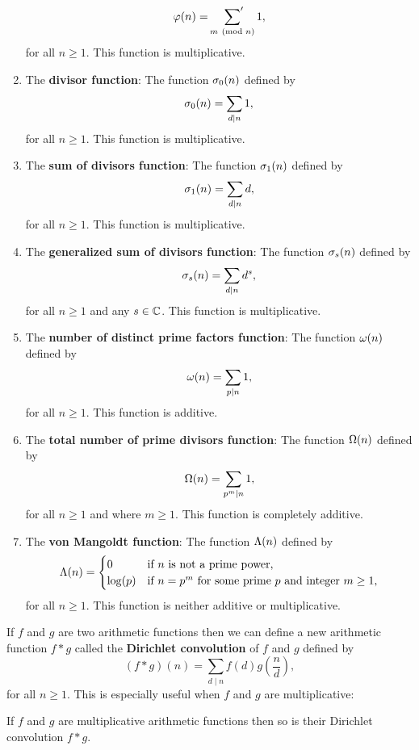 \begin{enumerate}[label=(\roman*)]
      \[
        \varphi(n) = \sideset{}{'}\sum_{m \ (\mathrm{mod}\text{ }n)}1,
      \]
      for all $n \ge 1$. This function is multiplicative.
      \item The \textbf{divisor function}: The function $\sigma_{0}(n)$ defined by
      \[
        \sigma_{0}(n) = \sum_{d \mid n}1,
      \]
      for all $n \ge 1$. This function is multiplicative.
      \item The \textbf{sum of divisors function}: The function $\sigma_{1}(n)$ defined by
      \[
        \sigma_{1}(n) = \sum_{d \mid n}d,
      \]
      for all $n \ge 1$. This function is multiplicative.
      \item The \textbf{generalized sum of divisors function}: The function $\sigma_{s}(n)$ defined by
      \[
        \sigma_{s}(n) = \sum_{d \mid n}d^{s},
      \]
      for all $n \ge 1$ and any $s \in \mathbb{C}$. This function is multiplicative.
      \item The \textbf{number of distinct prime factors function}: The function $\omega(n)$ defined by
      \[
        \omega(n) = \sum_{p \mid n}1,
      \]
      for all $n \ge 1$. This function is additive.
      \item The \textbf{total number of prime divisors function}: The function $\Omega(n)$ defined by
      \[
        \Omega(n) = \sum_{p ^{m} \mid n}1,
      \]
      for all $n \ge 1$ and where $m \ge 1$. This function is completely additive.
      \item The \textbf{von Mangoldt function}: The function $\Lambda(n)$ defined by
      \[
        \Lambda(n) = \begin{cases} 0 & \text{if $n$ is not a prime power}, \\ \log(p) & \text{if $n = p^{m}$ for some prime $p$ and integer $m \ge 1$}, \end{cases}
      \]
      for all $n \ge 1$. This function is neither additive or multiplicative.
    \end{enumerate}
    If $f$ and $g$ are two arithmetic functions then we can define a new arithmetic function $f \ast g$ called the \textbf{Dirichlet convolution} of $f$ and $g$ defined by
    \[
      (f \ast g)(n) = \sum_{d \mid n}f(d)g\left(\frac{n}{d}\right),
    \]
    for all $n \ge 1$. This is especially useful when $f$ and $g$ are multiplicative:

    \begin{proposition}
      If $f$ and $g$ are multiplicative arithmetic functions then so is their Dirichlet convolution $f \ast g$.
    \end{proposition}

